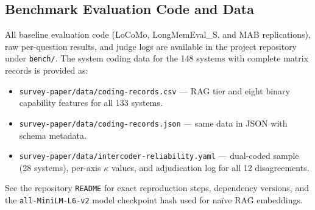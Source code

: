 \subsection{Benchmark Evaluation Code and Data}
\label{sec:appendix-code}

All baseline evaluation code (LoCoMo, LongMemEval\_S, and MAB
replications), raw per-question results, and judge logs are available in
the project repository~\cite{alaya2026} under \texttt{bench/}.  The
system coding data for the 148 systems with complete matrix records is
provided as:
\begin{itemize}[leftmargin=*, nosep]
  \item \texttt{survey-paper/data/coding-records.csv} --- RAG tier and
    eight binary capability features for all 133 systems.
  \item \texttt{survey-paper/data/coding-records.json} --- same data in
    JSON with schema metadata.
  \item \texttt{survey-paper/data/intercoder-reliability.yaml} ---
    dual-coded sample (28 systems), per-axis $\kappa$ values,
    and adjudication log for all 12 disagreements.
\end{itemize}
See the repository \texttt{README} for exact reproduction steps,
dependency versions, and the \texttt{all-MiniLM-L6-v2} model checkpoint
hash used for na\"ive RAG embeddings.
